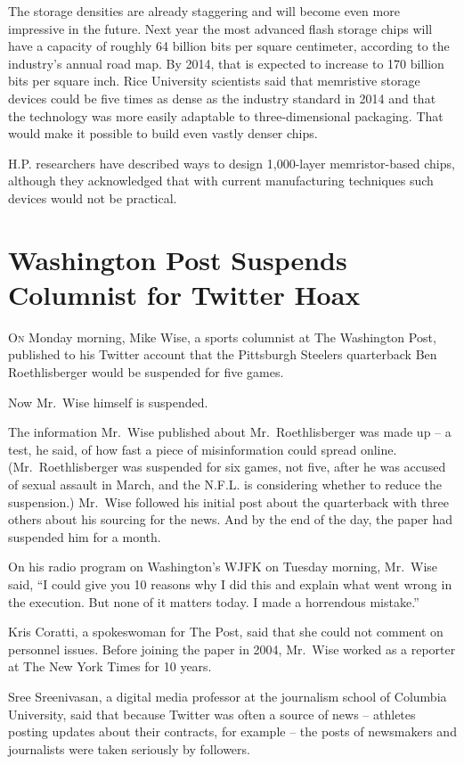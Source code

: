 ﻿\documentclass[12pt]{article}
\begin{document}
The storage densities are already staggering and will become even more impressive in the future.
Next year the most advanced flash storage chips will have a capacity of roughly 64 billion bits per
square centimeter, according to the industry's annual road map. By 2014, that is expected to
increase to 170 billion bits per square inch. Rice University scientists said that memristive
storage devices could be five times as dense as the industry standard in 2014 and that the
technology was more easily adaptable to three-dimensional packaging. That would make it possible to
build even vastly denser chips.

H.P. researchers have described ways to design 1,000-layer memristor-based chips, although they
acknowledged that with current manufacturing techniques such devices would not be practical.

\pagebreak
\section{Washington Post Suspends Columnist for Twitter Hoax}

\lettrine{O}{n} Monday morning, Mike Wise, a sports columnist at The
Washington Post, published to his Twitter account that the Pittsburgh Steelers quarterback Ben
Roethlisberger would be suspended for five games.

Now Mr.~Wise himself is suspended.

The information Mr.~Wise published about Mr.~Roethlisberger was made up -- a test, he said, of how
fast a piece of misinformation could spread online. (Mr.~Roethlisberger was suspended for six games,
not five, after he was accused of sexual assault in March, and the N.F.L. is considering whether to
reduce the suspension.) Mr.~Wise followed his initial post about the quarterback with three others
about his sourcing for the news. And by the end of the day, the paper had suspended him for a month.

On his radio program on Washington's WJFK on Tuesday morning, Mr.~Wise said, ``I could give you 10
reasons why I did this and explain what went wrong in the execution. But none of it matters today. I
made a horrendous mistake.''

Kris Coratti, a spokeswoman for The Post, said that she could not comment on personnel issues.
Before joining the paper in 2004, Mr.~Wise worked as a reporter at The New York Times for 10 years.

Sree Sreenivasan, a digital media professor at the journalism school of Columbia University, said
that because Twitter was often a source of news -- athletes posting updates about their contracts,
for example -- the posts of newsmakers and journalists were taken seriously by followers.
\end{document}
